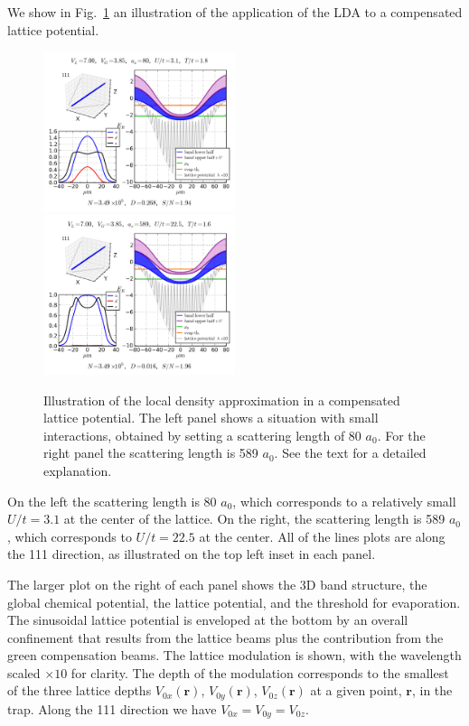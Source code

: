 \documentclass[11pt,letter]{article}
\newcommand{\bv}[1]{\ensuremath{\bm{#1}}}
\begin{document}
We show in Fig.~\ref{fig:illustrate_lda}  an illustration of the application of
the LDA to a compensated lattice potential.   
\begin{figure}
 \includegraphics[width=0.5\textwidth]{../Ut_Comp/T00/111_as0080.png}
 \includegraphics[width=0.5\textwidth]{../Ut_Comp/T00/111_as0589.png}
\caption[Local density approximation in a compensated lattice potential]{\small
Illustration of the local density approximation in a compensated lattice
potential.  The left panel shows a situation with small interactions, obtained
by setting a scattering length of 80 $a_{0}$. For the right panel the
scattering length is 589 $a_{0}$.  See the text for a detailed explanation. } 
\label{fig:illustrate_lda}
\end{figure}
On the left the scattering length is 80 $a_{0}$,  which corresponds to a
relatively small $U/t=3.1$ at the center of the lattice.   On the right, the
scattering length is 589 $a_{0}$, which corresponds to $U/t=22.5$ at the
center.   All of the lines plots are along the 111 direction,  as illustrated
on the top left inset in each panel.  

The larger plot on the right of each panel shows the 3D band structure, the
global chemical potential, the lattice potential, and the threshold for
evaporation.  The sinusoidal lattice potential is enveloped at the bottom by an
overall confinement that results from the lattice beams plus the contribution
from the green compensation beams.   The lattice modulation is shown, with the
wavelength scaled $\times10$ for clarity.  The depth of the modulation
corresponds to the smallest of the three lattice depths $V_{0x}(\bv{r})$,
$V_{0y}(\bv{r})$, $V_{0z}(\bv{r})$ at a given point, $\bv{r}$, in the trap. 
Along the 111 direction we have $V_{0x} = V_{0y} = V_{0z}$. 
\end{document}
